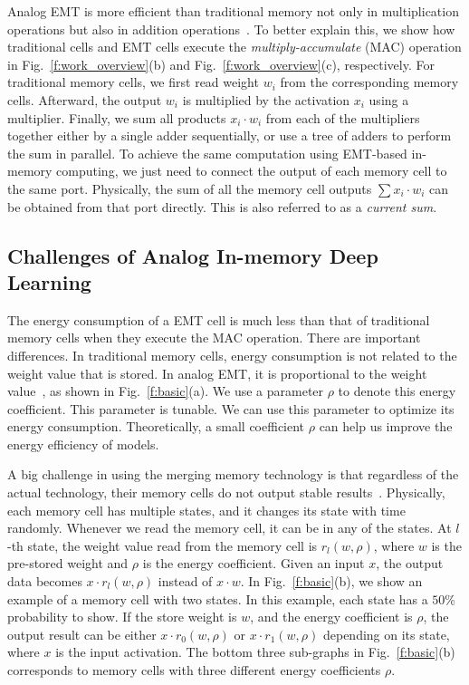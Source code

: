 \documentclass[10pt,journal,compsoc]{IEEEtran}
\begin{document}
Analog EMT is more efficient than traditional memory not only in multiplication operations but also in addition operations~\cite{pedretti2021memory}. To better explain this, we show how traditional cells and EMT cells execute the {\em multiply-accumulate} (MAC) operation in Fig.~\ref{f:work_overview}(b) and Fig.~\ref{f:work_overview}(c), respectively. For traditional memory cells, we first read weight $w_i$ from the corresponding memory cells. Afterward, the output $w_i$ is multiplied by the activation $x_i$ using a multiplier. Finally, we sum all products $x_i\cdot w_i$ from each of the multipliers together either by a single adder sequentially, or use a tree of adders to perform the sum in parallel. To achieve the same computation using EMT-based in-memory computing, we just need to connect the output of each memory cell to the same port. Physically, the sum of all the memory cell outputs $\sum x_i\cdot w_i$ can be obtained from that port directly. This is also referred to as a {\em current sum}.

\subsection{Challenges of Analog In-memory Deep Learning}

The energy consumption of a EMT cell is much less than that of traditional memory cells when they execute the MAC operation. There are important differences. In traditional memory cells, energy consumption is not related to the weight value that is stored. In analog EMT, it is proportional to the weight value~\cite{wang2020ncpower}, as shown in Fig.~\ref{f:basic}(a). We use a parameter $\rho$ to denote this energy coefficient. This parameter is tunable. We can use this parameter to optimize its energy consumption. Theoretically, a small coefficient $\rho$ can help us  improve the energy efficiency of models.

A big challenge in using the merging memory technology is that regardless of the actual technology, their memory cells do not output stable results~\cite{raghavan2013rtn}. Physically, each memory cell has multiple states, and it changes its state with time randomly. Whenever we read the memory cell, it can be in any of the states. At $l$-th state, the weight value read from the memory cell is $r_l(w,\rho)$, where $w$ is the pre-stored weight and $\rho$ is the energy coefficient. Given an input $x$, the output data becomes $x\cdot r_l(w,\rho)$ instead of $x\cdot w$. In Fig.~\ref{f:basic}(b), we show an example of a memory cell with two states. In this example, each state has a $50$\% probability to show. If the store weight is $w$, and the energy coefficient is $\rho$, the output result can be either $x\cdot r_0(w,\rho)$ or $x\cdot r_1(w,\rho)$ depending on its state, where $x$ is the input activation. The bottom three sub-graphs in Fig.~\ref{f:basic}(b) corresponds to memory cells with three different energy coefficients $\rho$.
\end{document}
